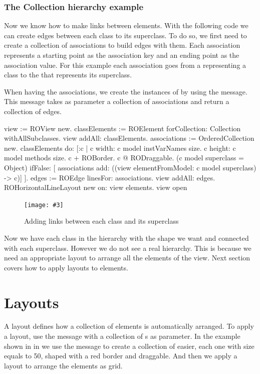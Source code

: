 \documentclass[a4paper,10pt,twoside]{book}
\newcommand{\fig}[4]{
		\begin{figure}[#1]
			\centering
			\texttt{[image: \#3]}
			\caption{\label{fig:#3}#4}
		\end{figure}}
\begin{document}
\subsubsection{The Collection hierarchy example}
Now we know how to make links between elements. With the following code we can create edges between each class to its superclass. 
To do so, we first need to create a collection of associations to build edges with them. Each association represents a starting point as the association key and an ending point as the association value. For this example each association goes from a  representing a class to the  that represents its superclass. 

When having the associations, we create the instances of  by using the  message. This message takes as parameter a collection of associations and return a collection of edges.


\begin{code}{}
view := ROView new.
classElements := ROElement forCollection: Collection withAllSubclasses.
view addAll: classElements.
associations := OrderedCollection new.
classElements do: [:c | 
	c width: c model instVarNames size.
	c height: c model methods size.
	c + ROBorder. 
	c @ RODraggable.	
	(c model superclass = Object)
		ifFalse: [ associations add: ((view elementFromModel: c model superclass) -> c)]	
	 ].
edges := ROEdge linesFor: associations.
view addAll: edges.
ROHorizontalLineLayout new on: view elements.
view open
\end{code}

\fig{H}{0.6}{hier3}{Adding links between each class and its superclass}

Now we have each class in the  hierarchy with the shape we want and connected with each superclass. However we do not see a real hierarchy. This is because we need an appropriate layout to arrange all the elements of the view. Next section covers how to apply layouts to elements.


\section{Layouts} 
A layout defines how a collection of elements is automatically arranged. To apply a layout, use the  message with a collection of s as parameter. In the example shown in in  we use the  message to create a collection of  easier, each one with size equals to 50, shaped with a red border and draggable. And then we apply a layout to arrange the elements as grid.
\end{document}
